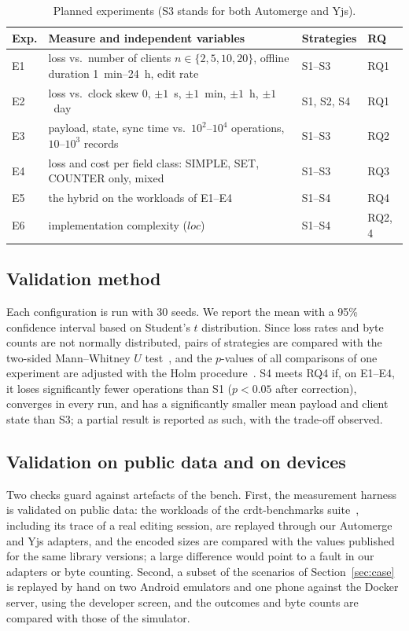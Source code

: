 \begin{table}[ht]
\caption{Planned experiments (S3 stands for both Automerge and Yjs).}
\label{tab:experiments}
\footnotesize
\begin{tabular}{@{}l>{\raggedright\arraybackslash}p{}ll@{}}
\toprule
Exp. & Measure and independent variables & Strategies & RQ \\
\midrule
E1 & loss vs.\ number of clients $n \in \{2,5,10,20\}$, offline duration 1~min--24~h, edit rate & S1--S3 & RQ1 \\
E2 & loss vs.\ clock skew $0$, $\pm 1$~s, $\pm 1$~min, $\pm 1$~h, $\pm 1$~day & S1, S2, S4 & RQ1 \\
E3 & payload, state, sync time vs.\ $10^2$--$10^4$ operations, $10$--$10^3$ records & S1--S3 & RQ2 \\
E4 & loss and cost per field class: SIMPLE, SET, COUNTER only, mixed & S1--S3 & RQ3 \\
E5 & the hybrid on the workloads of E1--E4 & S1--S4 & RQ4 \\
E6 & implementation complexity ($\mathit{loc}$) & S1--S4 & RQ2, 4 \\
\bottomrule
\end{tabular}
\end{table}

\subsection{Validation method}
Each configuration is run with 30 seeds. We report the mean with a 95\% confidence interval based on Student's
$t$ distribution. Since loss rates and byte counts are not normally distributed, pairs of strategies are compared with
the two-sided Mann--Whitney $U$ test~\cite{mann1947test}, and the $p$-values of all comparisons of one experiment are
adjusted with the Holm procedure~\cite{holm1979simple}. S4 meets RQ4 if, on E1--E4, it loses significantly fewer
operations than S1 ($p < 0.05$ after correction), converges in every run, and has a significantly smaller mean payload
and client state than S3; a partial result is reported as such, with the trade-off observed.

\subsection{Validation on public data and on devices}\label{sec:validation}
Two checks guard against artefacts of the bench. First, the measurement harness is validated on public data: the
workloads of the crdt-benchmarks suite~\cite{crdtbenchmarks}, including its trace of a real editing session, are
replayed through our Automerge and Yjs adapters, and the encoded sizes are compared with the values published for the
same library versions; a large difference would point to a fault in our adapters or byte counting. Second, a subset of
the scenarios of Section~\ref{sec:case} is replayed by hand on two Android emulators and one phone against the Docker
server, using the developer screen, and the outcomes and byte counts are compared with those of the simulator.
